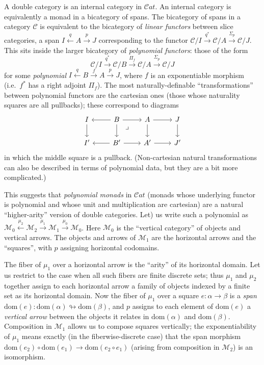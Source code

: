 \documentclass{article}
\theoremstyle{definition}
\theoremstyle{remark}
\let\sto\looparrowright
\def\M{\mathcal{M}}
\def\Cat{\mathcal{C}\mathit{at}}
\def\sC{\mathscr{C}}
\def\dom{\mathrm{dom}}
\let\xto\xrightarrow
\let\xot\xleftarrow
\begin{document}
A double category is an internal category in $\Cat$.
An internal category is equivalently a monad in a bicategory of spans.
The bicategory of spans in a category $\sC$ is equivalent to the bicategory of \emph{linear functors} between slice categories, a span $I \xot{q} A \xto{p} J$ corresponding to the functor $\sC/I \xto{q^*} \sC/A \xto{\Sigma_p} \sC/J$.
This sits inside the larger bicategory of \emph{polynomial functors}: those of the form
\[ \sC/I \xto{q^*} \sC/B \xto{\Pi_f} \sC/A \xto{\Sigma_p} \sC/J \]
for some \emph{polynomial} $I \xot{q} B \xto{f} A \xto{p} J$, where $f$ is an exponentiable morphism (i.e.\ $f^*$ has a right adjoint $\Pi_f$).
The most naturally-definable ``transformations'' between polynomial functors are the cartesian ones (those whose naturality squares are all pullbacks); these correspond to diagrams 
\begin{equation}
\begin{tikzcd}
  I \ar[d] & B \ar[l] \ar[r]\ar[d] \ar[dr,phantom,near start,"\lrcorner"] & A \ar[r]\ar[d] & J\ar[d] \\
  I' & B' \ar[l] \ar[r] & A' \ar[r] & J'
\end{tikzcd}\label{eq:poly-cartmap}
\end{equation}
in which the middle square is a pullback.
(Non-cartesian natural transformations can also be described in terms of polynomial data, but they are a bit more complicated.)

This suggests that \emph{polynomial monads} in $\Cat$ (monads whose underlying functor is polynomial and whose unit and multiplication are cartesian) are a natural ``higher-arity'' version of double categories.
Let) us write such a polynomial as $\M_0 \xot{\mu_2} \M_2 \xto{\mu_1} \M_1 \xto{\mu_0} \M_0$.
Here $\M_0$ is the ``vertical category'' of objects and vertical arrows.
The objects and arrows of $\M_1$ are the horizontal arrows and the ``squares'', with $p$ assigning horizontal codomains.

The fiber of $\mu_1$ over a horizontal arrow is the ``arity'' of its horizontal domain.
Let us restrict to the case when all such fibers are finite discrete sets; thus $\mu_1$ and $\mu_2$ together assign to each horizontal arrow a family of objects indexed by a finite set as its horizontal domain.
Now the fiber of $\mu_1$ over a square $e:\alpha\to\beta$ is a \emph{span} $\dom(e):\dom(\alpha)\sto\dom(\beta)$, and $p$ assigns to each element of $\dom(e)$ a \emph{vertical arrow} between the objects it relates in $\dom(\alpha)$ and $\dom(\beta)$.
Composition in $\M_1$ allows us to compose squares vertically; the exponentiability of $\mu_1$ means exactly (in the fiberwise-discrete case) that the span morphism $\dom(e_2) \circ \dom(e_1) \to \dom(e_2\circ e_1)$ (arising from composition in $\M_2$) is an isomorphism.
\end{document}
